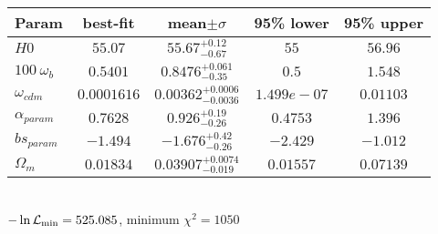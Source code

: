 \begin{tabular}{|l|c|c|c|c|} 
 \hline 
Param & best-fit & mean$\pm\sigma$ & 95\% lower & 95\% upper \\ \hline 
$H0$ &$55.07$ & $55.67_{-0.67}^{+0.12}$ & $55$ & $56.96$ \\ 
$100~\omega_{b }$ &$0.5401$ & $0.8476_{-0.35}^{+0.061}$ & $0.5$ & $1.548$ \\ 
$\omega_{cdm }$ &$0.0001616$ & $0.00362_{-0.0036}^{+0.0006}$ & $1.499e-07$ & $0.01103$ \\ 
$\alpha_{param }$ &$0.7628$ & $0.926_{-0.26}^{+0.19}$ & $0.4753$ & $1.396$ \\ 
$bs_{param }$ &$-1.494$ & $-1.676_{-0.26}^{+0.42}$ & $-2.429$ & $-1.012$ \\ 
$\Omega_{m }$ &$0.01834$ & $0.03907_{-0.019}^{+0.0074}$ & $0.01557$ & $0.07139$ \\ 
\hline 
 \end{tabular} \\ 
$-\ln{\cal L}_\mathrm{min} =525.085$, minimum $\chi^2=1050$ \\ 
